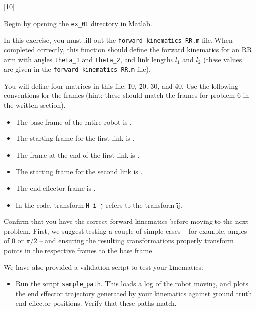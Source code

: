 \documentclass{16384_doc}
\begin{document}
\begin{questions}
    [10]

    Begin by opening the \verb!ex_01! directory in Matlab.

    In this exercise, you must fill out the \verb!forward_kinematics_RR.m! file.
    When completed correctly, this function should define the forward kinematics
    for an RR arm with angles \verb!theta_1! and \verb!theta_2!, and link
    lengths $l_1$ and $l_2$ (these values are given in the
    \verb!forward_kinematics_RR.m! file).

    You will define four matrices in this file: \H{1}{0}, \H{2}{0}, \H{3}{0},
    and \H{4}{0}.  Use the following conventions for the frames (hint: these
    should match the frames for problem 6 in the written section).

    \begin{itemize}
        \item The base frame of the entire robot is .
        \item The starting frame for the first link is .
        \item The frame at the end of the first link is .
        \item The starting frame for the second link is .
        \item The end effector frame is .

        \item In the code, transform \verb!H_i_j! refers to the transform \H{i}{j}.
    \end{itemize}

    Confirm that you have the correct forward kinematics before moving to the
    next problem.  First, we suggest testing a couple of simple cases -- for
    example, angles of $0$ or $\pi / 2$ -- and ensuring the resulting
    transformations properly transform points in the respective frames to the
    base frame.

    We have also provided a validation script to test your kinematics:

    \begin{itemize}
        \item Run the script \verb!sample_path!.  This loads a log of the robot
            moving, and plots the end effector trajectory generated by your
            kinematics against ground truth end effector positions.  Verify that
            these paths match.
    \end{itemize}


\end{questions}
\end{document}
